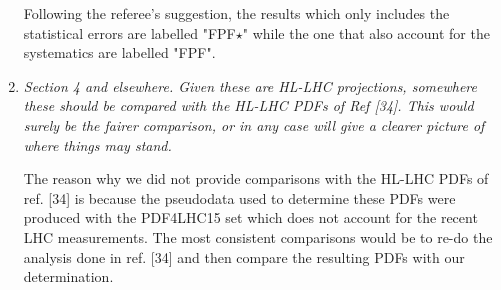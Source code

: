 \documentclass[11pt,a4paper]{article}
\begin{document}
\begin{enumerate}
	Following the referee's suggestion, the results which only includes the statistical errors
	are labelled "FPF$\star$" while the one that also account for the systematics are labelled "FPF".
	
	\item {\it Section 4 and elsewhere. Given these are HL-LHC projections, somewhere these should
		be compared with the HL-LHC PDFs of Ref [34]. This would surely be the fairer
		comparison, or in any case will give a clearer picture of where things may stand.
	}
	
	The reason why we did not provide comparisons with the HL-LHC PDFs of ref. [34] is because
	the pseudodata used to determine these PDFs were produced with the PDF4LHC15 set which
	does not account for the recent LHC measurements. The most consistent comparisons would
	be to re-do the analysis done in ref. [34] and then compare the resulting PDFs with our 
	determination.

\end{enumerate}
	
	
\end{document}

